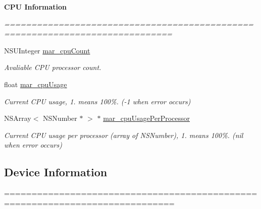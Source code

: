 \begin{Indent}\textbf{ C\+PU Information}\par
{\em ============================================================================= 

 }\begin{DoxyCompactItemize}
\item 
N\+S\+U\+Integer \hyperlink{category_u_i_device_07_m_a_r_e_x_08_aeb0162bf9de5e337734a75fd16d3ecb8}{mar\+\_\+cpu\+Count}
\begin{DoxyCompactList}\small\item\em Avaliable C\+PU processor count. \end{DoxyCompactList}\item 
float \hyperlink{category_u_i_device_07_m_a_r_e_x_08_a27b9fdce82f856a071878c11102c1b75}{mar\+\_\+cpu\+Usage}
\begin{DoxyCompactList}\small\item\em Current C\+PU usage, 1. means 100\%. (-\/1 when error occurs) \end{DoxyCompactList}\item 
N\+S\+Array$<$ N\+S\+Number $\ast$ $>$ $\ast$ \hyperlink{category_u_i_device_07_m_a_r_e_x_08_a2f06298fa1c10778e4d6f61ffd6247cb}{mar\+\_\+cpu\+Usage\+Per\+Processor}
\begin{DoxyCompactList}\small\item\em Current C\+PU usage per processor (array of N\+S\+Number), 1. means 100\%. (nil when error occurs) \end{DoxyCompactList}\end{DoxyCompactItemize}
\end{Indent}
\subsection*{Device Information}
\label{_amgrp3eb209d4fc62634ff71d1b309c753968}%
============================================================================= 

